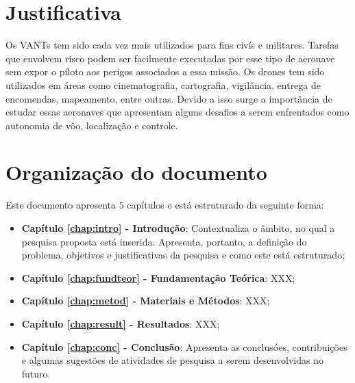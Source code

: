 









\section{Justificativa}
\label{sec:justi}

Os VANTs tem sido cada vez mais utilizados para fins civís e militares. Tarefas que envolvem risco podem ser facilmente executadas por esse tipo de aeronave sem expor o piloto aos perigos associados a essa missão. Os drones tem sido utilizados em áreas como cinematografia, cartografia, vigilância, entrega de encomendas, mapeamento, entre outras. Devido a isso surge a importância de estudar essas aeronaves que apresentam alguns desafios a serem enfrentados como autonomia de vôo, localização e controle.




\section{Organização do documento}
\label{section:organizacao}

Este documento apresenta $5$ capítulos e está estruturado da seguinte forma:

\begin{itemize}

  \item \textbf{Capítulo \ref{chap:intro} - Introdução}: Contextualiza o âmbito, no qual a pesquisa proposta está inserida. Apresenta, portanto, a definição do problema, objetivos e justificativas da pesquisa e como este \thetypeworkthree está estruturado;
  \item \textbf{Capítulo \ref{chap:fundteor} - Fundamentação Teórica}: XXX;
  \item \textbf{Capítulo \ref{chap:metod} - Materiais e Métodos}: XXX;
  \item \textbf{Capítulo \ref{chap:result} - Resultados}: XXX;
  \item \textbf{Capítulo \ref{chap:conc} - Conclusão}: Apresenta as conclusóes, contribuições e algumas sugestões de atividades de pesquisa a serem desenvolvidas no futuro.

\end{itemize}

